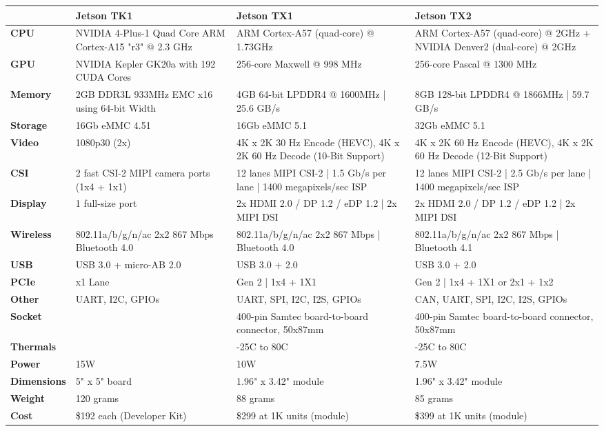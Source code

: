 \documentclass[letterpaper,10pt,serif,draftclsnofoot,onecolumn,compsoc,titlepage]{IEEEtran}
\begin{document}
\begin{tabular}{|l|p{5cm}|p{5cm}|p{5cm}|}
	\hline
	\textbf{} & \textbf{Jetson TK1} & \textbf{Jetson TX1} & \textbf{Jetson TX2}\\
	\hline
	\textbf{CPU} & NVIDIA 4-Plus-1 Quad Core ARM Cortex-A15 "r3" @ 2.3 GHz & ARM Cortex-A57 (quad-core) @ 1.73GHz & ARM Cortex-A57 (quad-core) @ 2GHz + NVIDIA Denver2 (dual-core) @ 2GHz\\
	\hline
	\textbf{GPU} & NVIDIA Kepler GK20a with 192 CUDA Cores & 256-core Maxwell @ 998 MHz & 256-core Pascal @ 1300 MHz\\
	\hline
	\textbf{Memory} & 2GB DDR3L 933MHz EMC x16 using 64-bit Width & 4GB 64-bit LPDDR4 @ 1600MHz | 25.6 GB/s & 8GB 128-bit LPDDR4 @ 1866MHz | 59.7 GB/s\\
	\hline
	\textbf{Storage} & 16Gb eMMC 4.51 & 16Gb eMMC 5.1 & 32Gb eMMC 5.1\\
	\hline
	\textbf{Video} & 1080p30 (2x) & 4K x 2K 30 Hz Encode (HEVC), 4K x 2K 60 Hz Decode (10-Bit Support) & 4K x 2K 60 Hz Encode (HEVC), 4K x 2K 60 Hz Decode (12-Bit Support)\\
	\hline
	\textbf{CSI} & 2 fast CSI-2 MIPI camera ports (1x4 + 1x1) & 12 lanes MIPI CSI-2 | 1.5 Gb/s per lane | 1400 megapixels/sec ISP & 12 lanes MIPI CSI-2 | 2.5 Gb/s per lane | 1400 megapixels/sec ISP\\
	\hline
	\textbf{Display} & 1 full-size port & 2x HDMI 2.0 / DP 1.2 / eDP 1.2 | 2x MIPI DSI & 2x HDMI 2.0 / DP 1.2 / eDP 1.2 | 2x MIPI DSI\\
	\hline
	\textbf{Wireless} & 802.11a/b/g/n/ac 2x2 867 Mbps Bluetooth 4.0 & 802.11a/b/g/n/ac 2x2 867 Mbps | Bluetooth 4.0 & 802.11a/b/g/n/ac 2x2 867 Mbps | Bluetooth 4.1\\
	\hline
	\textbf{USB} & USB 3.0 + micro-AB 2.0 & USB 3.0 + 2.0 & USB 3.0 + 2.0\\
	\hline
	\textbf{PCIe} & x1 Lane & Gen 2 | 1x4 + 1X1 & Gen 2 | 1x4 + 1X1 or 2x1 + 1x2\\
	\hline
	\textbf{Other} & UART, I2C, GPIOs & UART, SPI, I2C, I2S, GPIOs & CAN, UART, SPI, I2C, I2S, GPIOs\\
	\hline
	\textbf{Socket} & & 400-pin Samtec board-to-board connector, 50x87mm & 400-pin Samtec board-to-board connector, 50x87mm\\
	\hline
	\textbf{Thermals} & & -25\degree C to 80\degree C & -25\degree C to 80\degree C\\
	\hline
	\textbf{Power} & 15W & 10W & 7.5W\\
	\hline
	\textbf{Dimensions} & 5" x 5" board & 1.96" x 3.42" module & 1.96" x 3.42" module\\
	\hline
	\textbf{Weight} & 120 grams & 88 grams & 85 grams\\
	\hline
	\textbf{Cost} & \$192 each (Developer Kit) & \$299 at 1K units (module) & \$399 at 1K units (module)\\
	\hline
\end{tabular}
\end{document}
